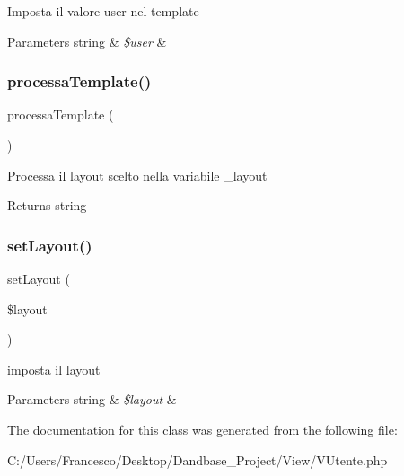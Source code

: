 Imposta il valore user nel template


\begin{DoxyParams}[1]{Parameters}
string & {\em \$user} & \\
\hline
\end{DoxyParams}
\mbox{\label{class_v_utente_a64bdc484fc7074989b4b2c0ebc63aec2}} 
\subsubsection{\texorpdfstring{processa\+Template()}{processaTemplate()}}
{\footnotesize\ttfamily processa\+Template (\begin{DoxyParamCaption}{ }\end{DoxyParamCaption})}

Processa il layout scelto nella variabile \+\_\+layout

\begin{DoxyReturn}{Returns}
string 
\end{DoxyReturn}
\mbox{\label{class_v_utente_a702b3376618a26e6c02c05bae65c6b9e}} 
\subsubsection{\texorpdfstring{set\+Layout()}{setLayout()}}
{\footnotesize\ttfamily set\+Layout (\begin{DoxyParamCaption}\item[{}]{\$layout }\end{DoxyParamCaption})}

imposta il layout


\begin{DoxyParams}[1]{Parameters}
string & {\em \$layout} & \\
\hline
\end{DoxyParams}


The documentation for this class was generated from the following file\+:\begin{DoxyCompactItemize}
\item 
C\+:/\+Users/\+Francesco/\+Desktop/\+Dandbase\+\_\+\+Project/\+View/V\+Utente.\+php\end{DoxyCompactItemize}
